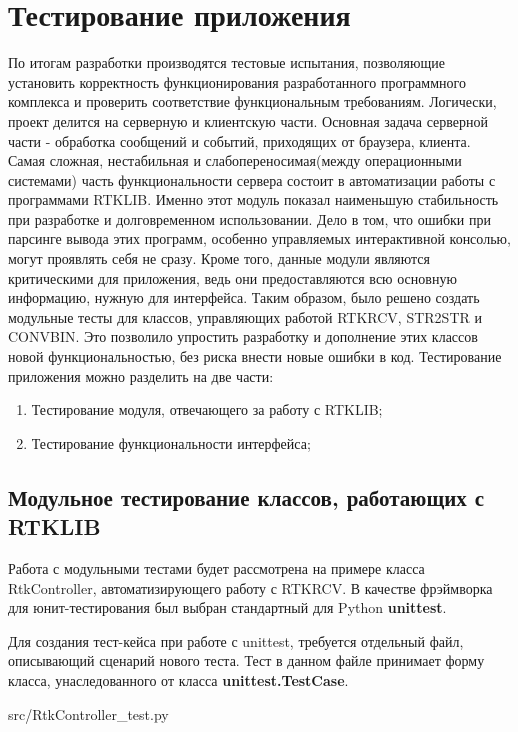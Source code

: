 \chapter{Тестирование приложения} \label{chapt4}

По итогам разработки производятся тестовые испытания, позволяющие установить корректность функционирования разработанного программного комплекса и проверить соответствие функциональным требованиям. Логически, проект делится на серверную и клиентскую части. Основная задача серверной части - обработка сообщений и событий, приходящих от браузера, клиента. Самая сложная, нестабильная и слабопереносимая(между операционными системами) часть функциональности сервера состоит в автоматизации работы с программами RTKLIB. Именно этот модуль показал наименьшую стабильность при разработке и долговременном использовании. Дело в том, что ошибки при парсинге вывода этих программ, особенно управляемых интерактивной консолью, могут проявлять себя не сразу. Кроме того, данные модули являются критическими для приложения, ведь они предоставляются всю основную информацию, нужную для интерфейса. Таким образом, было решено создать модульные тесты для классов, управляющих работой RTKRCV, STR2STR и CONVBIN. Это позволило упростить разработку и дополнение этих классов новой функциональностью, без риска внести новые ошибки в код. Тестирование приложения можно разделить на две части:

\begin{enumerate}
  \item Тестирование модуля, отвечающего за работу с RTKLIB;
  \item Тестирование функциональности интерфейса;
\end{enumerate}

\section{Модульное тестирование классов, работающих с RTKLIB} \label{sect4_1}

Работа с модульными тестами будет рассмотрена на примере класса RtkController, автоматизирующего работу с RTKRCV. В качестве фрэймворка для юнит-тестирования был выбран стандартный для Python \textbf{unittest}.

Для создания тест-кейса при работе с unittest, требуется отдельный файл, описывающий сценарий нового теста. Тест в данном файле принимает форму класса, унаследованного от класса \textbf{unittest.TestCase}.


{src/RtkController_test.py}

